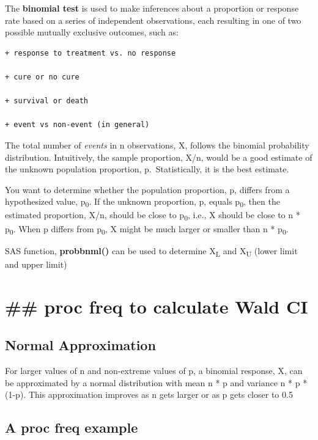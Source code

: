 \documentclass[
]{book}
\begin{document}
The \textbf{binomial test} is used to make inferences about a proportion or response
rate based on a series of independent observations, each resulting in one of two
possible mutually exclusive outcomes, such as:

\begin{verbatim}
+ response to treatment vs. no response

+ cure or no cure

+ survival or death

+ event vs non-event (in general)
\end{verbatim}

The total number of \emph{events} in n observations, X, follows the binomial probability
distribution. Intuitively, the sample proportion, X/n, would be a good estimate of
the unknown population proportion, p.~Statistically, it is the best estimate.

You want to determine whether the population proportion, p, differs from a
hypothesized value, p\textsubscript{0}. If the unknown proportion, p, equals p\textsubscript{0}, then the estimated proportion, X/n,
should be close to p\textsubscript{0}, i.e., X should be close to n * p\textsubscript{0}. When p differs from p\textsubscript{0},
X might be much larger or smaller than n * p\textsubscript{0}.

SAS function, \textbf{probbnml()} can be used to determine X\textsubscript{L} and X\textsubscript{U} (lower limit and
upper limit)

\hypertarget{proc-freq-to-calculate-wald-ci}{%
\chapter{\#\# proc freq to calculate Wald CI}\label{proc-freq-to-calculate-wald-ci}}

\hypertarget{normal-approximation}{%
\section{Normal Approximation}\label{normal-approximation}}

For larger values of n and non-extreme values of p, a binomial response, X, can be
approximated by a normal distribution with mean n * p and variance n * p * (1-p). This
approximation improves as n gets larger or as p gets closer to 0.5

\hypertarget{a-proc-freq-example}{%
\section{A proc freq example}\label{a-proc-freq-example}}
\end{document}
